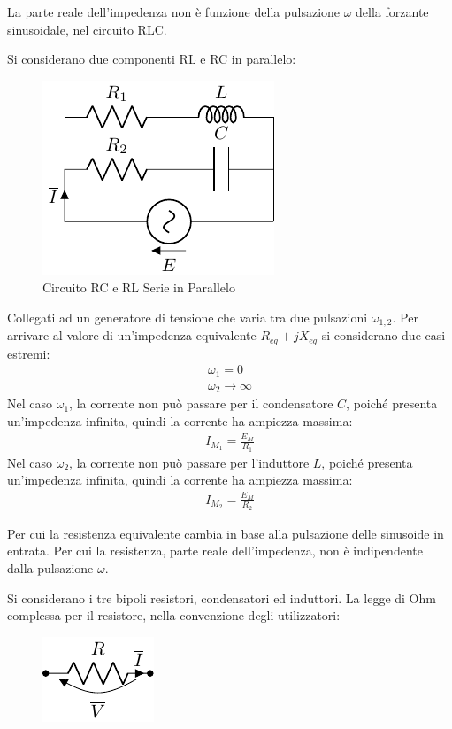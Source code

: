 \documentclass{article}
\numberwithin{equation}{subsection}
\begin{document}
La parte reale dell'impedenza non è funzione della pulsazione $\omega$ della forzante sinusoidale, nel circuito RLC. 

Si considerano due componenti RL e RC in parallelo:
\begin{figure}[H]%
    \centering
    \includegraphics{circuito-rc-rl-parallelo.pdf}
    \caption{Circuito RC e RL Serie in Parallelo}
    \label{fig:circuito-rc-rl-parellelo}
\end{figure}

Collegati ad un generatore di tensione che varia tra due pulsazioni $\omega_{1,2}$. Per arrivare al valore di un'impedenza equivalente $R_{eq}+jX_{eq}$ si considerano due 
casi estremi:
\begin{gather*}
    \omega_1=0\\
    \omega_2\to\infty
\end{gather*}
Nel caso $\omega_1$, la corrente non può passare per il condensatore $C$, poiché presenta un'impedenza infinita, quindi la corrente ha ampiezza massima:
\begin{gather*}
    I_{M_1}=\displaystyle\frac{E_M}{R_1}
\end{gather*}
Nel caso $\omega_2$, la corrente non può passare per l'induttore $L$, poiché presenta un'impedenza infinita, quindi la corrente ha ampiezza massima:
\begin{gather*}
    I_{M_2}=\displaystyle\frac{E_M}{R_2}
\end{gather*}

Per cui la resistenza equivalente cambia in base alla pulsazione delle sinusoide in entrata. Per cui la resistenza, parte reale dell'impedenza, non è indipendente dalla 
pulsazione $\omega$. 


Si considerano i tre bipoli resistori, condensatori ed induttori. 
La legge di Ohm complessa per il resistore, nella convenzione degli utilizzatori:
\begin{figure}[H]%
    \centering
    \includegraphics{resistore-fasori.pdf}
    \label{fig:resistore-fasori}
\end{figure}
\end{document}
